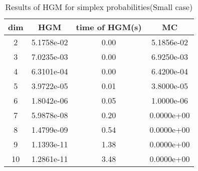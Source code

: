 \begin{table}[htbp]
\begin{center}
\begin{tabular}{cccc}
dim& HGM & time of HGM(s) & MC\\
\hline
2 & 5.1758e-02 & 0.00 & 5.1856e-02\\
3 & 7.0235e-03 & 0.00 & 6.9250e-03\\
4 & 6.3101e-04 & 0.00 & 6.4200e-04\\
5 & 3.9722e-05 & 0.01 & 3.8000e-05\\
6 & 1.8042e-06 & 0.05 & 1.0000e-06\\
7 & 5.9878e-08 & 0.20 & 0.0000e+00\\
8 & 1.4799e-09 & 0.54 & 0.0000e+00\\
9 & 1.1393e-11 & 1.38 & 0.0000e+00\\
10 & 1.2861e-11 & 3.48 & 0.0000e+00\\
\hline
\end{tabular}
\end{center}
\caption{Results of HGM for simplex probabilities(Small case)}
\label{tab3}
\end{table}
